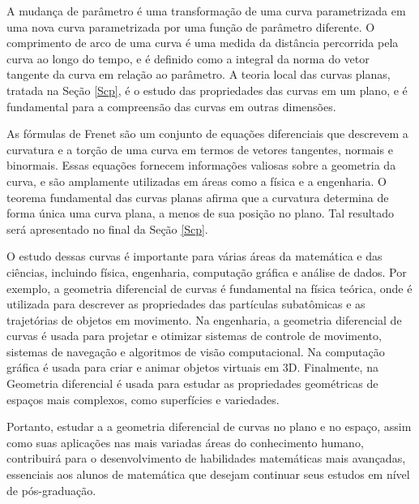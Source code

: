 \documentclass[12pt,leqno,twoside]{amsart}
\theoremstyle{definition}
\begin{document}
\vspace{0.3cm}

A mudança de parâmetro é uma transformação de uma curva parametrizada em uma nova curva parametrizada por uma função de parâmetro diferente. O comprimento de arco de uma curva é uma medida da distância percorrida pela curva ao longo do tempo, e é definido como a integral da norma do vetor tangente da curva em relação ao parâmetro. A teoria local das curvas planas, tratada na Seção \ref{Scp},  é o estudo das propriedades das curvas em um plano, e é fundamental para a compreensão das curvas em outras dimensões.

\vspace{0.3cm}

As fórmulas de Frenet são um conjunto de equações diferenciais que descrevem a curvatura e a torção de uma curva em termos de vetores tangentes, normais e binormais. Essas equações fornecem informações valiosas sobre a geometria da curva, e são amplamente utilizadas em áreas como a física e a engenharia. O teorema fundamental das curvas planas afirma que a curvatura determina de forma única uma curva plana,  a menos de sua posição no plano. Tal resultado será apresentado no final da Seção \ref{Scp}.

\vspace{0.3cm}

 O estudo dessas curvas é importante para várias áreas da matemática e das ciências, incluindo física, engenharia, computação gráfica e análise de dados. Por exemplo, a geometria diferencial de curvas é fundamental na física teórica, onde é utilizada para descrever as propriedades das partículas subatômicas e as trajetórias de objetos em movimento. Na engenharia, a geometria diferencial de curvas é usada para projetar e otimizar sistemas de controle de movimento, sistemas de navegação e algoritmos de visão computacional. Na computação gráfica  é usada para criar e animar objetos virtuais em 3D. Finalmente, na Geometria diferencial é usada para  estudar as propriedades geométricas de espaços mais complexos, como superfícies e variedades.

\vspace{0.3cm}

Portanto, estudar a a geometria diferencial de curvas no plano e no espaço, assim como suas aplicações nas mais variadas áreas do conhecimento humano,  contribuirá para o desenvolvimento de habilidades matemáticas mais avançadas, essenciais aos alunos de matemática que desejam continuar seus estudos em nível de pós-graduação.
\end{document}
